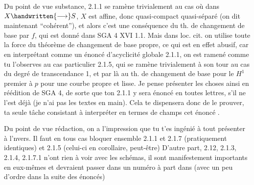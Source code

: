 
Du point de vue substance, 2.1.1 se ramène trivialement au cas où dans $X\handwritten{\longrightarrow}S$, $X$ est affine, donc quasi-compact quasi-séparé (on dit maintenant ``cohérent''), et alors c'est une conséquence du th. de changement de base par $f$, qui est donné dans SGA 4 XVI 1.1. Mais dans loc. cit. on utilise toute la force du théorème de changement de base propre, ce qui est en effet abusif, car en interprétant comme un énoncé d'acyclicité globale 2.1.1, on est ramené comme tu l'observes  au cas particulier 2.1.5, qui se ramène trivialement à son tour au cas du degré de transcendance 1, et par là au th. de changement de base pour le $H^1$ premier à $p$ pour une courbe propre et lisse. Je pense présenter les choses ainsi en réédition de SGA 4, de sorte que ton 2.1.1 y sera énoncé en toutes lettres, s'il ne l'est déjà (je n'ai pas les textes en main). Cela te dispensera donc de le prouver, ta seule tâche consistant à interpréter en termes de champs cet énoncé .

Du point de vue rédaction, on a l'impression que tu t'es ingénié à tout présenter à l'nvers. Il faut en tous cas bloquer ensemble 2.1.1 et 2.1.7 (pratiquement identiques) et 2.1.5 (celui-ci en corollaire, peut-être)   D'autre part,  2.12, 2.1.3, 2.1.4, 2.1.7.1 n'ont rien à voir avec les schémas, il sont manifestement importants en eux-mêmes et devraient passer dans un numéro à part dans  (avec un peu d'ordre dans la suite des énoncés)

